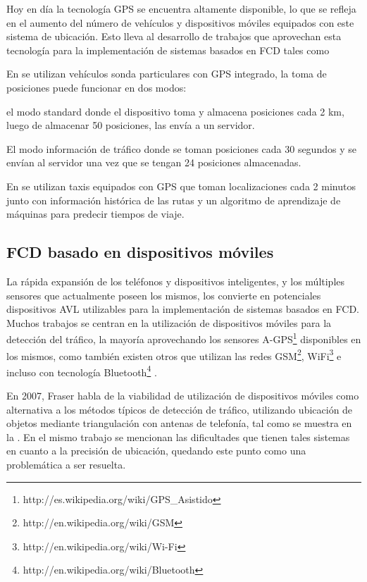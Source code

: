 Hoy en día la tecnología GPS se encuentra altamente disponible, lo que se refleja en el aumento del número de vehículos y dispositivos móviles equipados con este sistema de ubicación. Esto lleva al desarrollo de trabajos que aprovechan esta tecnología para la implementación de sistemas basados en FCD tales como  \citep{giovannini2011novel,li2007practical,sevlian2010travel,yin2004weight}

En \citep{giovannini2011novel} se utilizan vehículos sonda particulares con GPS integrado, la toma de posiciones puede funcionar en dos modos: \begin{enumerate*}[1)] \item el modo standard donde el dispositivo toma y almacena posiciones cada 2 km, luego de almacenar 50 posiciones, las envía a un servidor. \item El modo información de tráfico donde se toman posiciones cada 30 segundos y se envían al servidor una vez que se tengan 24 posiciones almacenadas.\end{enumerate*}

En \citep{sevlian2010travel} se utilizan taxis equipados con GPS que toman localizaciones cada 2 minutos junto con información histórica de las rutas y un algoritmo de aprendizaje de máquinas para predecir tiempos de viaje.

\subsection{FCD basado en dispositivos móviles}

La rápida expansión de los teléfonos y dispositivos inteligentes, y los múltiples sensores que actualmente poseen los mismos, los convierte en potenciales dispositivos AVL utilizables para la implementación de sistemas basados en FCD. Muchos trabajos se centran en la utilización de dispositivos móviles para la detección del tráfico, la mayoría aprovechando los sensores A-GPS\footnote{http://es.wikipedia.org/wiki/GPS\_Asistido} disponibles en los mismos, como también existen otros que utilizan las redes GSM\footnote{http://en.wikipedia.org/wiki/GSM}, WiFi\footnote{http://en.wikipedia.org/wiki/Wi-Fi} e incluso con tecnología Bluetooth\footnote{http://en.wikipedia.org/wiki/Bluetooth} \citep{thiagarajan2010cooperative,thiagarajan2009vtrack,fraser2007use,fang2011enacq,ruppe2012augmenting}.

En 2007, Fraser \citep{fraser2007use} habla de la viabilidad de utilización de dispositivos móviles como alternativa a los métodos típicos de detección de tráfico, utilizando ubicación de objetos mediante triangulación con antenas de telefonía, tal como se muestra en la . En el mismo trabajo se mencionan las dificultades que tienen tales sistemas en cuanto a la precisión de ubicación, quedando este punto como una problemática a ser resuelta.

